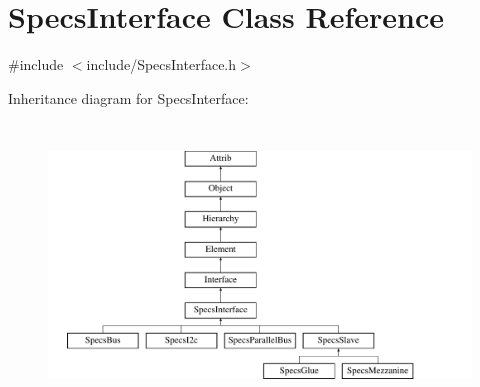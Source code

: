 \hypertarget{classSpecsInterface}{}\section{Specs\+Interface Class Reference}
\label{classSpecsInterface}


{\ttfamily \#include $<$include/\+Specs\+Interface.\+h$>$}

Inheritance diagram for Specs\+Interface\+:\begin{figure}[H]
\begin{center}
\leavevmode
\includegraphics[height=7.529412cm]{classSpecsInterface}
\end{center}
\end{figure}

